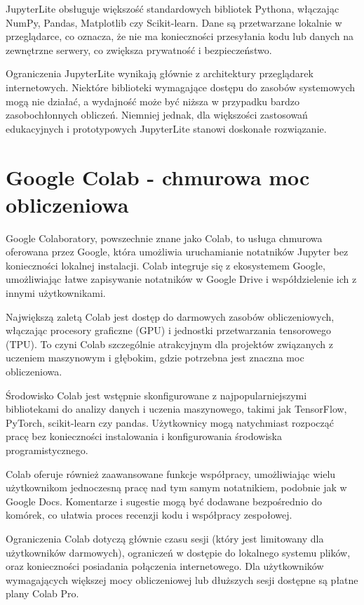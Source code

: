 \documentclass[
  polish,
  letterpaper,
  DIV=11,
  numbers=noendperiod]{scrreprt}
\begin{document}
JupyterLite obsługuje większość standardowych bibliotek Pythona,
włączając NumPy, Pandas, Matplotlib czy Scikit-learn. Dane są
przetwarzane lokalnie w przeglądarce, co oznacza, że nie ma konieczności
przesyłania kodu lub danych na zewnętrzne serwery, co zwiększa
prywatność i bezpieczeństwo.

Ograniczenia JupyterLite wynikają głównie z architektury przeglądarek
internetowych. Niektóre biblioteki wymagające dostępu do zasobów
systemowych mogą nie działać, a wydajność może być niższa w przypadku
bardzo zasobochłonnych obliczeń. Niemniej jednak, dla większości
zastosowań edukacyjnych i prototypowych JupyterLite stanowi doskonałe
rozwiązanie.

\section{Google Colab - chmurowa moc
obliczeniowa}\label{google-colab---chmurowa-moc-obliczeniowa}

Google Colaboratory, powszechnie znane jako Colab, to usługa chmurowa
oferowana przez Google, która umożliwia uruchamianie notatników Jupyter
bez konieczności lokalnej instalacji. Colab integruje się z ekosystemem
Google, umożliwiając łatwe zapisywanie notatników w Google Drive i
współdzielenie ich z innymi użytkownikami.

Największą zaletą Colab jest dostęp do darmowych zasobów obliczeniowych,
włączając procesory graficzne (GPU) i jednostki przetwarzania
tensorowego (TPU). To czyni Colab szczególnie atrakcyjnym dla projektów
związanych z uczeniem maszynowym i głębokim, gdzie potrzebna jest
znaczna moc obliczeniowa.

Środowisko Colab jest wstępnie skonfigurowane z najpopularniejszymi
bibliotekami do analizy danych i uczenia maszynowego, takimi jak
TensorFlow, PyTorch, scikit-learn czy pandas. Użytkownicy mogą
natychmiast rozpocząć pracę bez konieczności instalowania i
konfigurowania środowiska programistycznego.

Colab oferuje również zaawansowane funkcje współpracy, umożliwiając
wielu użytkownikom jednoczesną pracę nad tym samym notatnikiem, podobnie
jak w Google Docs. Komentarze i sugestie mogą być dodawane bezpośrednio
do komórek, co ułatwia proces recenzji kodu i współpracy zespołowej.

Ograniczenia Colab dotyczą głównie czasu sesji (który jest limitowany
dla użytkowników darmowych), ograniczeń w dostępie do lokalnego systemu
plików, oraz konieczności posiadania połączenia internetowego. Dla
użytkowników wymagających większej mocy obliczeniowej lub dłuższych
sesji dostępne są płatne plany Colab Pro.
\end{document}
